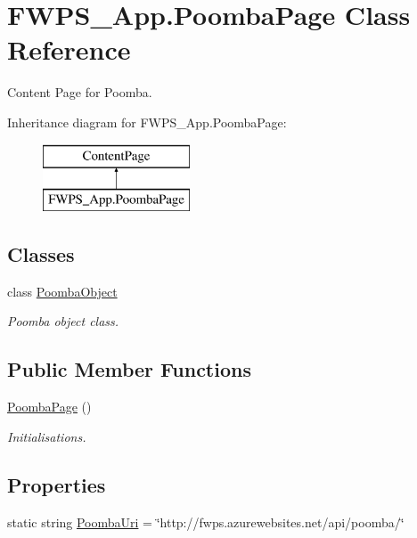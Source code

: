 \hypertarget{class_f_w_p_s___app_1_1_poomba_page}{}\section{F\+W\+P\+S\+\_\+\+App.\+Poomba\+Page Class Reference}
\label{class_f_w_p_s___app_1_1_poomba_page}


Content Page for Poomba.  


Inheritance diagram for F\+W\+P\+S\+\_\+\+App.\+Poomba\+Page\+:\begin{figure}[H]
\begin{center}
\leavevmode
\includegraphics[height=2.000000cm]{class_f_w_p_s___app_1_1_poomba_page}
\end{center}
\end{figure}
\subsection*{Classes}
\begin{DoxyCompactItemize}
\item 
class \mbox{\hyperlink{class_f_w_p_s___app_1_1_poomba_page_1_1_poomba_object}{Poomba\+Object}}
\begin{DoxyCompactList}\small\item\em Poomba object class. \end{DoxyCompactList}\end{DoxyCompactItemize}
\subsection*{Public Member Functions}
\begin{DoxyCompactItemize}
\item 
\mbox{\hyperlink{class_f_w_p_s___app_1_1_poomba_page_af94209763833dbb195686bfe6aa61410}{Poomba\+Page}} ()
\begin{DoxyCompactList}\small\item\em Initialisations. \end{DoxyCompactList}\end{DoxyCompactItemize}
\subsection*{Properties}
\begin{DoxyCompactItemize}
\item 
static string \mbox{\hyperlink{class_f_w_p_s___app_1_1_poomba_page_a1f47415b0a34565bf93db8d8d08444f9}{Poomba\+Uri}} = \char`\"{}http\+://fwps.\+azurewebsites.\+net/api/poomba/\char`\"{}
\end{DoxyCompactItemize}
